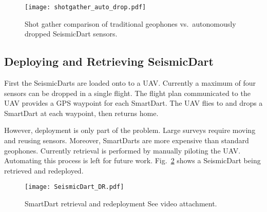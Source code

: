 \begin{figure} \centering
  {\texttt{[image: shotgather\_auto\_drop.pdf]}}
 \caption{Shot gather comparison of traditional geophones vs.\ autonomously dropped SeismicDart sensors. 
 \label{fig:shotgather_auto_drop}}
\end{figure}

\subsection{Deploying and Retrieving SeismicDart}
First the SeismicDarts are loaded onto to a UAV. 
Currently a maximum of four sensors can be dropped in a single flight. 
The flight plan communicated to the UAV provides a GPS waypoint for each SmartDart. 
The UAV flies to and drops a SmartDart at each waypoint, then returns home. 

However, deployment is only part of the problem. Large surveys require moving and reusing sensors.  
Moreover, SmartDarts are more expensive than standard geophones. 
Currently retrieval is performed by manually piloting the UAV. 
Automating this process is left for future work.
Fig.~\ref{fig:SeismicDart_DR} shows a SeismicDart being retrieved and redeployed.


\begin{figure} \centering
  {\texttt{[image: SeismicDart\_DR.pdf]}}
 \caption{SmartDart retrieval and redeployment  See video  attachment. 
 \label{fig:SeismicDart_DR}}
\end{figure}
 